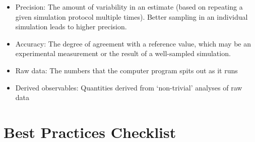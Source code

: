 \documentclass[9pt]{livecoms}
\begin{document}
\begin{itemize}
   \item Precision: The amount of variability in an estimate (based on repeating a given simulation protocol multiple times).
      Better sampling in an individual simulation leads to higher precision.
    \item Accuracy: The degree of agreement with a reference value, which may be an experimental measurement or the result of a well-sampled simulation.
    \item Raw data: The numbers that the computer program spits out as it runs
    \item Derived observables:  Quantities derived from ‘non-trivial’ analyses of raw data
\end{itemize}

\section{Best Practices Checklist}
\end{document}

